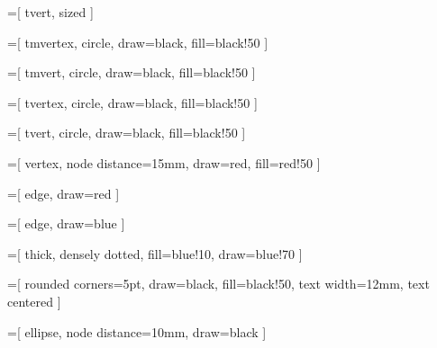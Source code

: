 =[
    tvert,
    sized
]

=[
    tmvertex,
	circle,
	draw=black,
	fill=black!50
]

=[
    tmvert,
	circle,
	draw=black,
	fill=black!50
]

=[
    tvertex,
	circle,
	draw=black,
	fill=black!50
]

=[
    tvert,
	circle,
	draw=black,
	fill=black!50
]

=[
	vertex,
	node distance=15mm,
	draw=red,
	fill=red!50
]

=[
	edge,
	draw=red
]

=[
	edge,
	draw=blue
]

=[
	thick, %
	densely dotted,
	fill=blue!10,
	draw=blue!70
]

=[
    rounded corners=5pt,
    draw=black,
    fill=black!50,
    text width=12mm,
    text centered
]

=[
    ellipse,
    node distance=10mm,
    draw=black
]

\newcommand{\base}[4]{
    \draw[->] (0,0) to (0, #1);
    \draw[->] (0,0) to (#2, 0);
    
    \node at (0, #1+2) {#3};
    \node at (#2 + 2, -2) {#4};
}

\newenvironment{ordo}[4][12]
{
    \begin{center}
    \begin{tikzpicture}
        \pgfmathparse{#3/#4 * #1} \let\xpas\pgfmathresult
        \pgfmathparse{int(#4/#3)} \let\nbpas\pgfmathresult
        \pgfmathparse{\xpas/#3} \let\unitxpas\pgfmathresult
        
        \draw[thick] (#1+1,0) -- (0,0) -- (0,#2) -- (#1+1,#2);

        \node[below] at (0, 0) {$0$};

        \foreach \x in {1,...,\nbpas}{
            \pgfmathparse{\x * \xpas} \let\abscisse\pgfmathresult
            \pgfmathparse{int(\x * #3)} \let\xlabel\pgfmathresult

            \node[below] at (\abscisse, 0) {$\xlabel$};
            \draw[dotted] (\abscisse,0) to (\abscisse,#2);
        }

        \foreach \y in {1,...,#2}{
            \pgfmathparse{\y - 0.5} \let\ordlabel\pgfmathresult

            \node[left] at (0, \ordlabel) {$M_\y$};
            \draw[dotted] (0, \y) to (#1+1, \y);
        }
}
{\end{tikzpicture}\end{center}}

